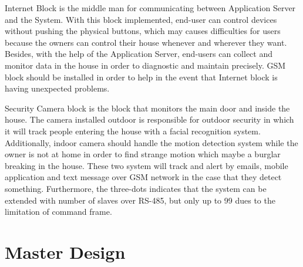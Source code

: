     Internet Block is the middle man for communicating between Application Server and the System. With this block implemented, end-user can control devices without pushing the physical buttons, which may causes difficulties for users because the owners can control their house whenever and wherever they want. Besides, with the help of the Application Server, end-users can collect and monitor data in the house in order to diagnostic and maintain precisely. GSM block should be installed in order to help in the event that Internet block is having unexpected problems.

    Security Camera block is the block that monitors the main door and inside the house. The camera installed outdoor is responsible for outdoor security in which it will track people entering the house with a facial recognition system. Additionally, indoor camera should handle the motion detection system while the owner is not at home in order to find strange motion which maybe a burglar breaking in the house. These two system will track and alert by emails, mobile application and text message over GSM network in the case that they detect something. Furthermore, the three-dots indicates that the system can be extended with number of slaves over RS-485, but only up to 99 dues to the limitation of command frame.
\section{Master Design}\label{masterDesign}
